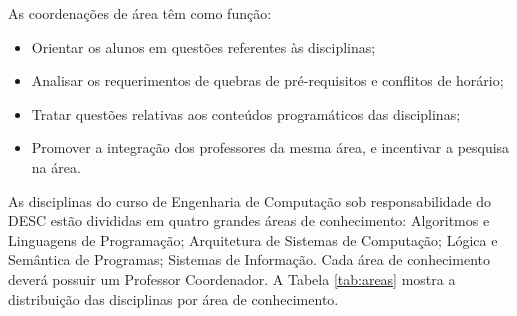 As coordenações de área têm como função:

\begin{itemize}
    \item Orientar os alunos em questões referentes às disciplinas;
    \item Analisar os requerimentos de quebras de pré-requisitos e conflitos de horário;
    \item Tratar questões relativas aos conteúdos programáticos das disciplinas;
    \item Promover a integração dos professores da mesma área, e incentivar a pesquisa na área.
\end{itemize}

As disciplinas do curso de Engenharia de Computação sob responsabilidade do DESC estão divididas em quatro grandes áreas de conhecimento: Algoritmos e Linguagens de Programação; Arquitetura de Sistemas de Computação; Lógica e Semântica de Programas; Sistemas de Informação. Cada área de conhecimento deverá possuir um Professor Coordenador. A Tabela \ref{tab:areas} mostra a distribuição das disciplinas por área de conhecimento.


